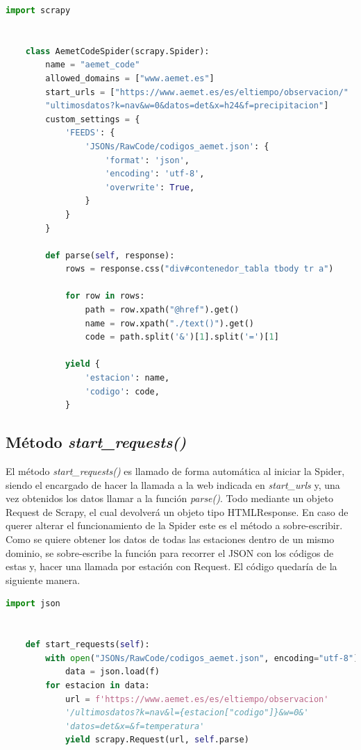 \begin{lstlisting}[language=Python, caption={Spider de ejemplo (Aemet Code Spider)}]
	import scrapy
	
	
	class AemetCodeSpider(scrapy.Spider):
		name = "aemet_code"
		allowed_domains = ["www.aemet.es"]
		start_urls = ["https://www.aemet.es/es/eltiempo/observacion/"
		"ultimosdatos?k=nav&w=0&datos=det&x=h24&f=precipitacion"]
		custom_settings = {
			'FEEDS': {
				'JSONs/RawCode/codigos_aemet.json': {
					'format': 'json',
					'encoding': 'utf-8',
					'overwrite': True,
				}
			}
		}
	
		def parse(self, response):
			rows = response.css("div#contenedor_tabla tbody tr a")
			
			for row in rows:
				path = row.xpath("@href").get()
				name = row.xpath("./text()").get()
				code = path.split('&')[1].split('=')[1]
			
			yield {
				'estacion': name,
				'codigo': code,
			}
\end{lstlisting}

\subsection{Método \textit{start\_requests()}}
El método \textit{start\_requests()} es llamado de forma automática al iniciar la Spider, siendo el encargado de hacer la llamada a la web indicada en \textit{start\_urls} y, una vez obtenidos los datos llamar a la función \textit{parse()}. Todo mediante un objeto Request de Scrapy, el cual devolverá un objeto tipo HTMLResponse. En caso de querer alterar el funcionamiento de la Spider este es el método a sobre-escribir.\newline
\newline
Como se quiere obtener los datos de todas las estaciones dentro de un mismo dominio, se sobre-escribe la función para recorrer el JSON con los códigos de estas y, hacer una llamada por estación con Request.\newline
\newline
El código quedaría de la siguiente manera.

\begin{lstlisting}[language=Python, caption={Sobre-escritura de \textit{start\_requests()}}]
	import json
	
	
	def start_requests(self):
		with open("JSONs/RawCode/codigos_aemet.json", encoding="utf-8") as f:
			data = json.load(f)
		for estacion in data:
			url = f'https://www.aemet.es/es/eltiempo/observacion'
			'/ultimosdatos?k=nav&l={estacion["codigo"]}&w=0&'
			'datos=det&x=&f=temperatura'
			yield scrapy.Request(url, self.parse)
\end{lstlisting}

